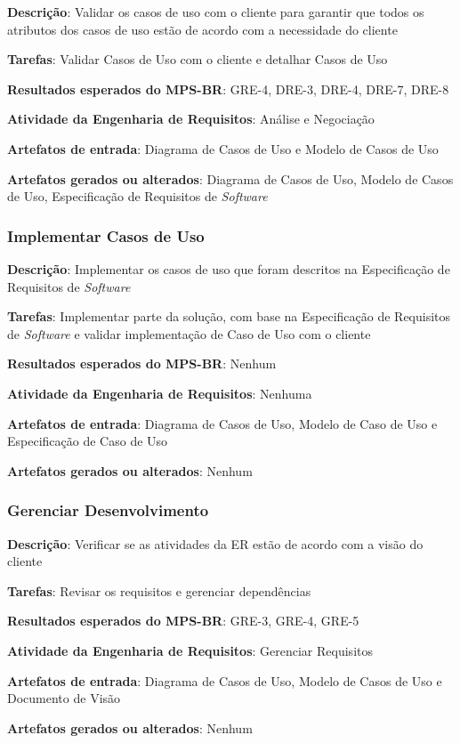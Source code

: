 \begin{description}
\item\textbf{Descrição}: Validar os casos de uso com o cliente para garantir que todos os atributos dos casos de uso estão de acordo com a necessidade do cliente
\item\textbf{Tarefas}: Validar Casos de Uso com o cliente e detalhar Casos de Uso
\item\textbf{Resultados esperados do MPS-BR}: GRE-4, DRE-3, DRE-4, DRE-7, DRE-8
\item\textbf{Atividade da Engenharia de Requisitos}: Análise e Negociação
\item\textbf{Artefatos de entrada}: Diagrama de Casos de Uso e Modelo de Casos de Uso
\item\textbf{Artefatos gerados ou alterados}: Diagrama de Casos de Uso, Modelo de Casos de Uso, Especificação de Requisitos de \textit{Software}
\end{description}

\subsubsection{Implementar Casos de Uso}

\begin{description}
\item\textbf{Descrição}: Implementar os casos de uso que foram descritos na Especificação de Requisitos de \textit{Software}
\item\textbf{Tarefas}: Implementar parte da solução, com base na Especificação de Requisitos de \textit{Software} e validar implementação de Caso de Uso com o cliente
\item\textbf{Resultados esperados do MPS-BR}: Nenhum
\item\textbf{Atividade da Engenharia de Requisitos}: Nenhuma
\item\textbf{Artefatos de entrada}: Diagrama de Casos de Uso, Modelo de Caso de Uso e Especificação de Caso de Uso
\item\textbf{Artefatos gerados ou alterados}: Nenhum
\end{description}

\subsubsection{Gerenciar Desenvolvimento}

\begin{description}
\item\textbf{Descrição}: Verificar se as atividades da ER estão de acordo com a visão do cliente
\item\textbf{Tarefas}: Revisar os requisitos e gerenciar dependências
\item\textbf{Resultados esperados do MPS-BR}: GRE-3, GRE-4, GRE-5
\item\textbf{Atividade da Engenharia de Requisitos}: Gerenciar Requisitos
\item\textbf{Artefatos de entrada}: Diagrama de Casos de Uso, Modelo de Casos de Uso e Documento de Visão
\item\textbf{Artefatos gerados ou alterados}: Nenhum
\end{description}


